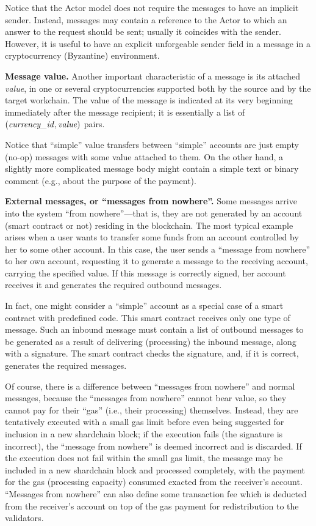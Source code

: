 \documentclass[12pt,oneside]{article}
\def\makepoint#1{\medbreak\noindent{\bf #1.\ }}
\def\nxsubpoint{\refstepcounter{subsubsection}%
  \smallbreak\makepoint{\thesubsubsection}}
\def\embt(#1.){\textbf{#1.}}
\let\vr=\textit
\def\currencyid{\vr{currency\_id\/}}
\begin{document}
Notice that the Actor model does not require the messages to have an
implicit sender. Instead, messages may contain a reference to the
Actor to which an answer to the request should be sent; usually it
coincides with the sender. However, it is useful to have an explicit
unforgeable sender field in a message in a cryptocurrency (Byzantine)
environment.

\nxsubpoint \embt(Message value.)  Another important characteristic of
a message is its attached {\em value}, in one or several
cryptocurrencies supported both by the source and by the target
workchain. The value of the message is indicated at its very beginning
immediately after the message recipient; it is essentially a list of
$(\currencyid,\vr{value})$ pairs.

Notice that ``simple'' value transfers between ``simple'' accounts are
just empty (no-op) messages with some value attached to them. On the
other hand, a slightly more complicated message body might contain a
simple text or binary comment (e.g., about the purpose of the
payment).

\nxsubpoint\label{sp:ext.msg} \embt(External messages, or ``messages
from nowhere''.)  Some messages arrive into the system ``from
nowhere''---that is, they are not generated by an account (smart
contract or not) residing in the blockchain. The most typical example
arises when a user wants to transfer some funds from an account
controlled by her to some other account. In this case, the user sends
a ``message from nowhere'' to her own account, requesting it to
generate a message to the receiving account, carrying the specified
value. If this message is correctly signed, her account receives it
and generates the required outbound messages.

In fact, one might consider a ``simple'' account as a special case of
a smart contract with predefined code. This smart contract receives
only one type of message. Such an inbound message must contain a list
of outbound messages to be generated as a result of delivering
(processing) the inbound message, along with a signature. The smart
contract checks the signature, and, if it is correct, generates the
required messages.

Of course, there is a difference between ``messages from nowhere'' and
normal messages, because the ``messages from nowhere'' cannot bear
value, so they cannot pay for their ``gas'' (i.e., their processing)
themselves. Instead, they are tentatively executed with a small gas
limit before even being suggested for inclusion in a new shardchain
block; if the execution fails (the signature is incorrect), the
``message from nowhere'' is deemed incorrect and is discarded. If the
execution does not fail within the small gas limit, the message may be
included in a new shardchain block and processed completely, with the
payment for the gas (processing capacity) consumed exacted from the
receiver's account. ``Messages from nowhere'' can also define some
transaction fee which is deducted from the receiver's account on top
of the gas payment for redistribution to the validators.
\end{document}
